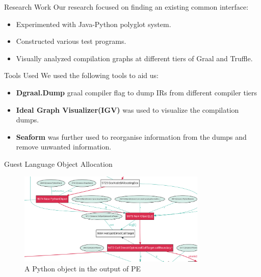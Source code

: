 \begin{frame}{Research Work}
    Our research focused on finding an existing common interface:
    \begin{itemize}
        \vspace{2mm}
        \item Experimented with Java-Python polyglot system.
        \vspace{2mm}
        \item Constructed various test programs.
        \vspace{2mm}
        \item Visually analyzed compilation graphs at different tiers of Graal and Truffle.
    \end{itemize}
\end{frame}

\begin{frame}{Tools Used}
    We used the following tools to aid us:
    \begin{itemize}
        \item \textbf{Dgraal.Dump} graal compiler flag to dump IRs from different compiler tiers
        \vspace{2mm}
        \item \textbf{Ideal Graph Visualizer(IGV)} was used to visualize the compilation dumps.
        \vspace{2mm}
        \item \textbf{Seaform} was further used to reorganise information from the dumps and remove unwanted information.
    \end{itemize}
\end{frame}
\begin{frame}{Guest Language Object Allocation}
    \begin{figure}[h]
        \centering
        \includegraphics[width=0.8\textwidth]{images/igv_dump}
        \caption{A Python object in the output of PE}
    \end{figure}
\end{frame}

